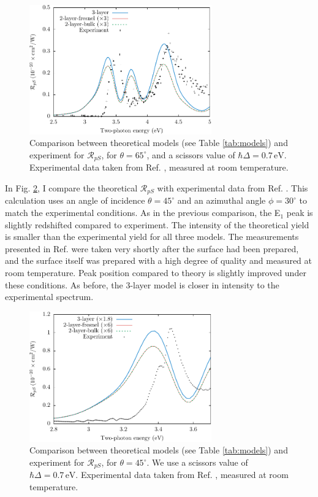 \begin{figure}[t]
\centering
\includegraphics[width=0.7\textwidth]{content/figures/fig-Si1x1-Mejia_RpS}
\caption{Comparison between theoretical models (see Table \ref{tab:models}) and
experiment for $\mathcal{R}_{pS}$, for $\theta=65^{\circ}$, and a scissors value
of $\hbar\Delta = 0.7\,\text{eV}$. Experimental data taken from Ref.
\cite{mejiaPRB02}, measured at room temperature.}
\label{fig:RpS}
\end{figure}

In Fig. \ref{fig:mitchellRpS}, I compare the theoretical $\mathcal{R}_{pS}$ with
experimental data from Ref. \cite{mitchellSS01}. This calculation uses an angle
of incidence $\theta=45^\circ$ and an azimuthal angle $\phi=30^\circ$ to match
the experimental conditions. As in the previous comparison, the E$_{1}$ peak is
slightly redshifted compared to experiment. The intensity of the theoretical
yield is smaller than the experimental yield for all three models. The
measurements presented in Ref. \cite{mitchellSS01} were taken very shortly after
the surface had been prepared, and the surface itself was prepared with a high
degree of quality and measured at room temperature. Peak position compared to
theory is slightly improved under these conditions. As before, the 3-layer model
is closer in intensity to the experimental spectrum.

\begin{figure}[t]
\centering
\includegraphics[width=0.7\textwidth]{content/figures/fig-Si1x1-Mitchell_RpS}
\caption{Comparison between theoretical models (see Table \ref{tab:models}) and
experiment for $\mathcal{R}_{pS}$, for $\theta=45^\circ$. We use a scissors
value of $\hbar\Delta = 0.7\,\text{eV}$. Experimental data taken from Ref.
\cite{mitchellSS01}, measured at room temperature.}
\label{fig:mitchellRpS}
\end{figure}

